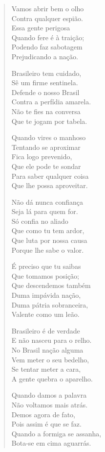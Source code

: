 \begin{verse}
Vamos abrir bem o olho\\
Contra qualquer espião.\\
Essa gente perigosa\\
Quando fere é à traição;\\
Podendo faz sabotagem\\
Prejudicando a nação.


Brasileiro tem cuidado,\\
Sê um firme sentinela.\\
Defende o nosso Brasil\\
Contra a perfídia amarela.\\
Não te fies na conversa\\
Que te jogam por tabela.

Quando vires o manhoso\\
Tentando se aproximar\\
Fica logo prevenido,\\
Que ele pode te sondar\\
Para saber qualquer coisa\\
Que lhe possa aproveitar.

Não dá nunca confiança\\
Seja lá para quem for.\\
Só confia no aliado\\
Que como tu tem ardor,\\
Que luta por nossa causa\\
Porque lhe sabe o valor.

É preciso que tu saibas\\
Que tomamos posição;\\
Que descendemos também\\
Duma impávida nação,\\
Duma pátria sobranceira,\\
Valente como um leão.


Brasileiro é de verdade\\
E não nasceu para o relho.\\
No Brasil nação alguma\\
Vem meter o seu bedelho,\\
Se tentar meter a cara,\\
A gente quebra o aparelho.

Quando damos a palavra\\
Não voltamos mais atrás.\\
Demos agora de fato,\\
Pois assim é que se faz.\\
Quando a formiga se assanha,\\
Bota-se em cima aguarrás.


\end{verse}
